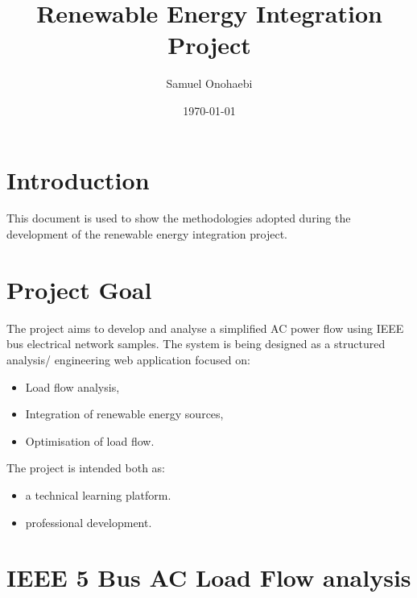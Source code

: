 \documentclass{article}
\title{Renewable Energy Integration Project}
\author{Samuel Onohaebi}
\date{\today}
\begin{document}
\maketitle

\section{Introduction}

This document is used to show the methodologies adopted during the development of the renewable energy integration project. 

\section{Project Goal}

The project aims to develop and analyse a simplified AC power flow using IEEE bus electrical network samples. 
The system is being designed as a structured analysis/ engineering web application focused on:

\begin{itemize}
    \item Load flow analysis,
    \item Integration of renewable energy sources,
    \item Optimisation of load flow.
\end{itemize}

\noindent The project is intended both as:

\begin{itemize}
    \item a technical learning platform.
    \item professional development.
\end{itemize}

\section{IEEE 5 Bus AC Load Flow analysis}
\end{document}
